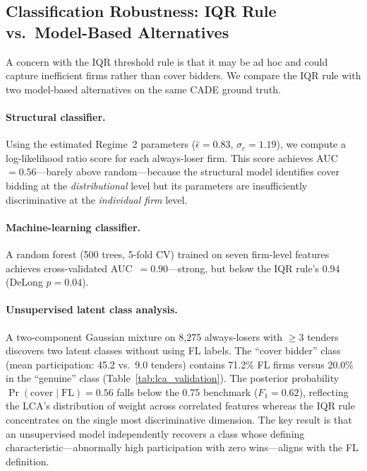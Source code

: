 
\subsection{Classification Robustness: IQR Rule vs.\ Model-Based Alternatives}
\label{sec:classification_robustness}

A concern with the IQR threshold rule is that it may be ad hoc and
could capture inefficient firms rather than cover bidders. We compare
the IQR rule with two model-based alternatives on the same CADE
ground truth.

\paragraph{Structural classifier.}
Using the estimated Regime~2 parameters ($\hat{\epsilon} = 0.83$,
$\hat{\sigma}_c = 1.19$), we compute a log-likelihood ratio score for
each always-loser firm. This score achieves AUC~$= 0.56$---barely
above random---because the structural model identifies cover bidding at
the \emph{distributional} level but its parameters are insufficiently
discriminative at the \emph{individual firm} level.

\paragraph{Machine-learning classifier.}
A random forest (500 trees, 5-fold CV) trained on seven firm-level
features achieves cross-validated AUC~$= 0.90$---strong, but below
the IQR rule's $0.94$ (DeLong $p = 0.04$).

\paragraph{Unsupervised latent class analysis.}
A two-component Gaussian mixture on 8,275 always-losers with $\geq 3$
tenders discovers two latent classes without using FL labels. The
``cover bidder'' class (mean participation: 45.2 vs.\ 9.0 tenders)
contains 71.2\% FL firms versus 20.0\% in the ``genuine'' class
(Table~\ref{tab:lca_validation}). The posterior probability
$\Pr(\text{cover} \mid \text{FL}) = 0.56$ falls below the 0.75
benchmark ($F_1 = 0.62$), reflecting the LCA's distribution of weight
across correlated features whereas the IQR rule concentrates on the
single most discriminative dimension. The key result is that an
unsupervised model independently recovers a class whose defining
characteristic---abnormally high participation with zero
wins---aligns with the FL definition.


